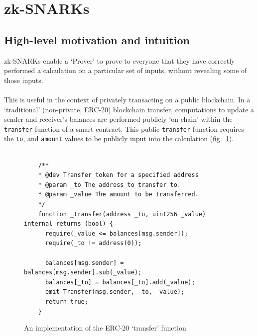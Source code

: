 \documentclass{article}
\begin{document}
\section{zk-SNARKs}
\label{sec:zkSnarks}

\subsection{High-level motivation and intuition}
zk-SNARKs enable a `Prover' to prove to everyone that they have correctly performed a calculation on a particular set of inputs, without revealing some of those inputs.\\
\\
This is useful in the context of privately transacting on a public blockchain. In a `traditional' (non-private, ERC-20) blockchain transfer, computations to update a sender and receiver's balances are performed publicly `on-chain' within the \texttt{transfer} function of a smart contract. This public \texttt{transfer} function requires the \texttt{to}, and \texttt{amount} values to be publicly input into the calculation (fig.~\ref{fig:codeTransfer}).

\begin{figure}[H]
  \begin{center}
    \begin{lstlisting}

    /**
    * @dev Transfer token for a specified address
    * @param _to The address to transfer to.
    * @param _value The amount to be transferred.
    */
    function _transfer(address _to, uint256 _value) internal returns (bool) {
      require(_value <= balances[msg.sender]);
      require(_to != address(0));

      balances[msg.sender] = balances[msg.sender].sub(_value);
      balances[_to] = balances[_to].add(_value);
      emit Transfer(msg.sender, _to, _value);
      return true;
    }

    \end{lstlisting}
    \caption{An implementation of the ERC-20 `transfer' function}
    \label{fig:codeTransfer}
  \end{center}
\end{figure}
\end{document}
